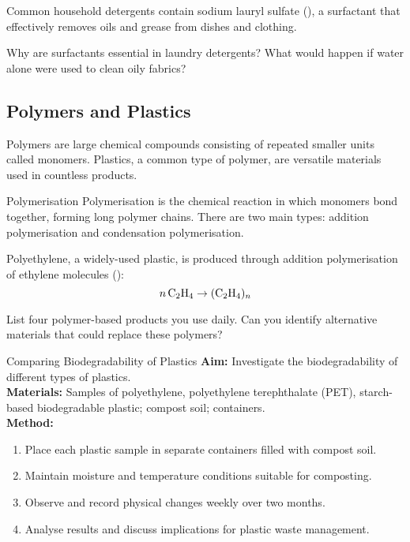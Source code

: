 \begin{example}
Common household detergents contain sodium lauryl sulfate (), a surfactant that effectively removes oils and grease from dishes and clothing.
\end{example}

\begin{stopandthink}
Why are surfactants essential in laundry detergents? What would happen if water alone were used to clean oily fabrics?
\end{stopandthink}

\subsection{Polymers and Plastics}

Polymers are large chemical compounds consisting of repeated smaller units called monomers. Plastics, a common type of polymer, are versatile materials used in countless products.

\begin{keyconcept}{Polymerisation}
Polymerisation is the chemical reaction in which monomers bond together, forming long polymer chains. There are two main types: addition polymerisation and condensation polymerisation.
\end{keyconcept}


\begin{example}
Polyethylene, a widely-used plastic, is produced through addition polymerisation of ethylene molecules ():
\[
n\,\ce{C2H4} \rightarrow (\ce{C2H4})_n
\]
\end{example}

\begin{stopandthink}
List four polymer-based products you use daily. Can you identify alternative materials that could replace these polymers?
\end{stopandthink}

\begin{investigation}{Comparing Biodegradability of Plastics}
\textbf{Aim:} Investigate the biodegradability of different types of plastics.\\
\textbf{Materials:} Samples of polyethylene, polyethylene terephthalate (PET), starch-based biodegradable plastic; compost soil; containers.\\
\textbf{Method:}
\begin{enumerate}
\item Place each plastic sample in separate containers filled with compost soil.
\item Maintain moisture and temperature conditions suitable for composting.
\item Observe and record physical changes weekly over two months.
\item Analyse results and discuss implications for plastic waste management.
\end{enumerate}
\end{investigation}

